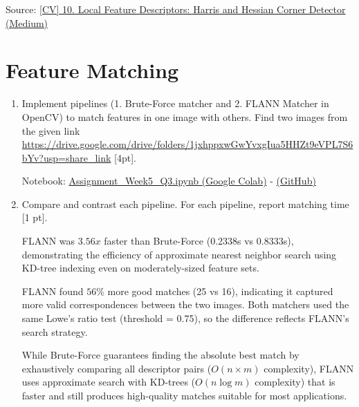 \documentclass[12pt,a4paper]{article}
\begin{document}
Source: \href{https://medium.com/jun94-devpblog/cv-10-local-feature-descriptors-harris-and-hessian-corner-detector-7d524888abfd}{[CV] 10. Local Feature Descriptors: Harris and Hessian Corner Detector (Medium)}

\section{Feature Matching}

\begin{enumerate}
    \item Implement pipelines (1. Brute-Force matcher and 2. FLANN Matcher in OpenCV) to match features in one image with others. Find two images from the given link 
    \url{https://drive.google.com/drive/folders/1jxhppxwGwYvxgIua5HHZt9eVPL7S6bYv?usp=share_link} [4pt].

Notebook: \href{https://colab.research.google.com/drive/1EQDte31rVoR3utRkTQFZ9Pr5DnIYloK3?usp=sharing}{Assignment\_Week5\_Q3.ipynb (Google Colab)} - 
\href{https://github.com/bkhanal-11/ties411_cvip_jyu/blob/master/assignment5/src/Assignment_Week5_Q3.ipynb}{(GitHub)}

    \item Compare and contrast each pipeline. For each pipeline, report matching time [1 pt].

    FLANN was $3.56x$ faster than Brute-Force (0.2338s vs 0.8333s), demonstrating the efficiency of approximate nearest neighbor search using KD-tree indexing even on moderately-sized feature sets.
    
    FLANN found $56\%$ more good matches (25 vs 16), indicating it captured more valid correspondences between the two images. Both matchers used the same Lowe's ratio test (threshold = 0.75), so the difference reflects FLANN's search strategy.
    
    While Brute-Force guarantees finding the absolute best match by exhaustively comparing all descriptor pairs ($O(n \times m)$ complexity), FLANN uses approximate search with KD-trees ($O(n \log m)$ complexity) that is faster and still produces high-quality matches suitable for most applications.    
    \end{enumerate}
\end{document}
